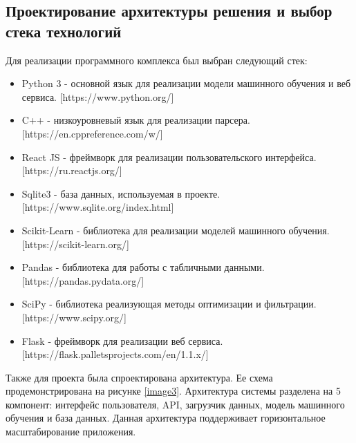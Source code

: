 \documentclass[a4paper,article,14pt]{extarticle}
\begin{document}
\subsection{Проектирование архитектуры решения и выбор стека технологий}

Для реализации программного комплекса был выбран следующий стек:
\begin{itemize}
    \item Python 3 - основной язык для реализации модели машинного обучения и веб сервиса. [https://www.python.org/]
    \item C++ - низкоуровневый язык для реализации парсера. [https://en.cppreference.com/w/]
    \item React JS - фреймворк для реализации пользовательского интерфейса. [https://ru.reactjs.org/]
    \item Sqlite3 - база данных, используемая в проекте. [https://www.sqlite.org/index.html]
    \item Scikit-Learn - библиотека для реализации моделей машинного обучения. [https://scikit-learn.org/]
    \item Pandas - библиотека для работы с табличными данными. [https://pandas.pydata.org/]
    \item SciPy - библиотека реализующая методы оптимизации и фильтрации. [https://www.scipy.org/]
    \item Flask - фреймворк для реализации веб сервиса. [https://flask.palletsprojects.com/en/1.1.x/]   
\end{itemize}

Также для проекта была спроектирована архитектура. Ее схема продемонстрирована на рисунке \ref{image3}. 
Архитектура системы разделена на 5 компонент: интерфейс пользователя, API,  
загрузчик данных, модель машинного обучения и база данных. 
Данная архитектура поддерживает горизонтальное  масштабирование приложения.
\end{document}
